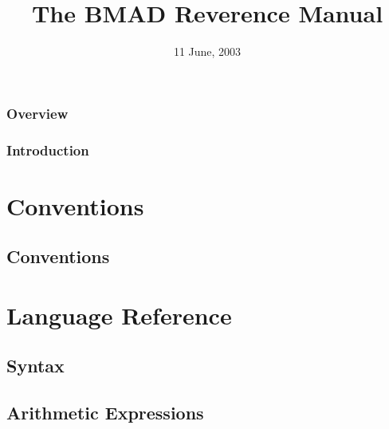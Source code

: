 \documentclass{book}
\begin{document}
\title{The BMAD Reverence Manual}

\date{11 June, 2003}
\maketitle

\section*{Overview}

\section*{Introduction}

\tableofcontents

\listoffigures

\listoftables

\part{Conventions}

\chapter{Conventions}


\part{Language Reference}


\chapter{Syntax}

\chapter{Arithmetic Expressions}
\end{document}
